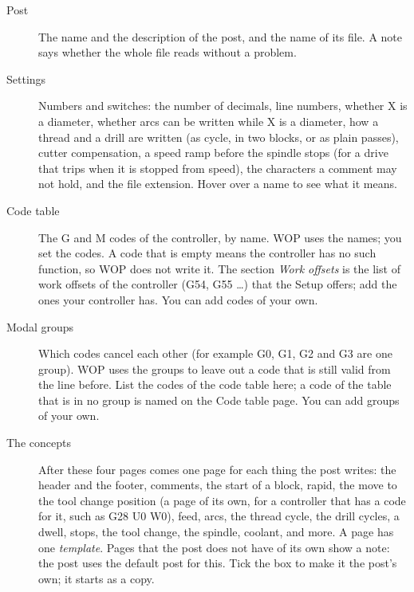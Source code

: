 \begin{description}
\item[Post] The name and the description of the post, and the name of its file. A note says whether the whole file reads without a problem.
\item[Settings] Numbers and switches: the number of decimals, line numbers, whether X is a diameter, whether arcs can be written while X is a diameter, how a thread and a drill are written (as cycle, in two blocks, or as plain passes), cutter compensation, a speed ramp before the spindle stops (for a drive that trips when it is stopped from speed), the characters a comment may not hold, and the file extension. Hover over a name to see what it means.
\item[Code table] The G and M codes of the controller, by name. WOP uses the names; you set the codes. A code that is empty means the controller has no such function, so WOP does not write it. The section \emph{Work offsets} is the list of work offsets of the controller (G54, G55 \ldots) that the Setup offers; add the ones your controller has. You can add codes of your own.
\item[Modal groups] Which codes cancel each other (for example G0, G1, G2 and G3 are one group). WOP uses the groups to leave out a code that is still valid from the line before. List the codes of the code table here; a code of the table that is in no group is named on the Code table page. You can add groups of your own.
\item[The concepts] After these four pages comes one page for each thing the post writes: the header and the footer, comments, the start of a block, rapid, the move to the tool change position (a page of its own, for a controller that has a code for it, such as G28 U0 W0), feed, arcs, the thread cycle, the drill cycles, a dwell, stops, the tool change, the spindle, coolant, and more. A page has one \emph{template}. Pages that the post does not have of its own show a note: the post uses the default post for this. Tick the box to make it the post's own; it starts as a copy.
\end{description}

